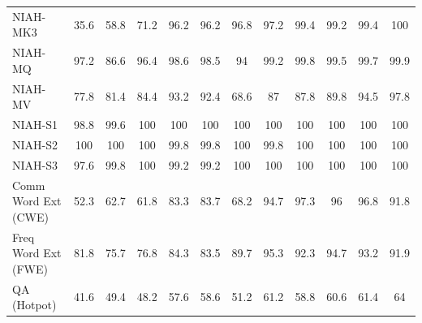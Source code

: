 \begin{table}[ht]
\begin{tabular}{l|ccccc|ccccc|c}
NIAH-MK3 & \cellcolor{myred!90} 35.6 & \cellcolor{myred!58} 58.8 & \cellcolor{myred!40} 71.2 & \cellcolor{myred!5} 96.2 & \cellcolor{myred!5} 96.2 & \cellcolor{myred!4} 96.8 & \cellcolor{myred!4} 97.2 & \cellcolor{myred!1} 99.4 & \cellcolor{myred!1} 99.2 & \cellcolor{myred!1} 99.4 & 100 \\
NIAH-MQ & \cellcolor{myred!18} 97.2 & \cellcolor{myred!90} 86.6 & \cellcolor{myred!24} 96.4 & \cellcolor{myred!8} 98.6 & \cellcolor{myred!9} 98.5 & \cellcolor{myred!40} 94 & \cellcolor{myred!4} 99.2 & \cellcolor{myred!1} 99.8 & \cellcolor{myred!2} 99.5 & \cellcolor{myred!1} 99.7 & 99.9 \\
NIAH-MV & \cellcolor{myred!61} 77.8 & \cellcolor{myred!51} 81.4 & \cellcolor{myred!41} 84.4 & \cellcolor{myred!14} 93.2 & \cellcolor{myred!17} 92.4 & \cellcolor{myred!90} 68.6 & \cellcolor{myred!33} 87 & \cellcolor{myred!31} 87.8 & \cellcolor{myred!25} 89.8 & \cellcolor{myred!10} 94.5 & 97.8 \\
NIAH-S1 & \cellcolor{myred!90} 98.8 & \cellcolor{myred!30} 99.6 & 100 & 100 & 100 & 100 & 100 & 100 & 100 & 100 & 100 \\
NIAH-S2 & 100 & 100 & 100 & \cellcolor{myred!90} 99.8 & \cellcolor{myred!90} 99.8 & 100 & \cellcolor{myred!90} 99.8 & 100 & 100 & 100 & 100 \\
NIAH-S3 & \cellcolor{myred!90} 97.6 & \cellcolor{myred!8} 99.8 & 100 & \cellcolor{myred!30} 99.2 & \cellcolor{myred!30} 99.2 & 100 & 100 & 100 & 100 & 100 & 100 \\
Comm Word Ext (CWE) & \cellcolor{myred!90} 52.3 & \cellcolor{myred!66} 62.7 & \cellcolor{myred!68} 61.8 & \cellcolor{myred!19} 83.3 & \cellcolor{myred!18} 83.7 & \cellcolor{myred!54} 68.2 & \cellcolor{royalblue!7} 94.7 & \cellcolor{royalblue!13} 97.3 & \cellcolor{royalblue!10} 96 & \cellcolor{royalblue!11} 96.8 & 91.8 \\
Freq Word Ext (FWE) & \cellcolor{myred!56} 81.8 & \cellcolor{myred!90} 75.7 & \cellcolor{myred!84} 76.8 & \cellcolor{myred!42} 84.3 & \cellcolor{myred!46} 83.5 & \cellcolor{myred!12} 89.7 & \cellcolor{royalblue!19} 95.3 & \cellcolor{royalblue!2} 92.3 & \cellcolor{royalblue!16} 94.7 & \cellcolor{royalblue!7} 93.2 & 91.9 \\
QA (Hotpot) & \cellcolor{myred!90} 41.6 & \cellcolor{myred!59} 49.4 & \cellcolor{myred!63} 48.2 & \cellcolor{myred!26} 57.6 & \cellcolor{myred!22} 58.6 & \cellcolor{myred!51} 51.2 & \cellcolor{myred!11} 61.2 & \cellcolor{myred!21} 58.8 & \cellcolor{myred!14} 60.6 & \cellcolor{myred!10} 61.4 & 64 \\

\end{tabular}
\end{table}

